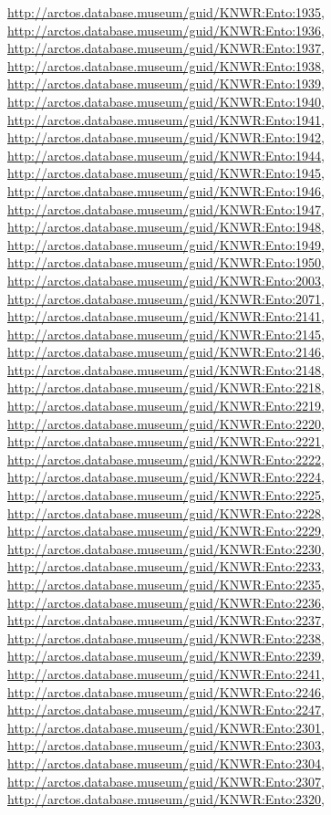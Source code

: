 \documentclass[9pt, article]{memoir}
\begin{document}
\begin{multicols}{2}
\url{http://arctos.database.museum/guid/KNWR:Ento:1935}, 
\url{http://arctos.database.museum/guid/KNWR:Ento:1936}, 
\url{http://arctos.database.museum/guid/KNWR:Ento:1937}, 
\url{http://arctos.database.museum/guid/KNWR:Ento:1938}, 
\url{http://arctos.database.museum/guid/KNWR:Ento:1939}, 
\url{http://arctos.database.museum/guid/KNWR:Ento:1940}, 
\url{http://arctos.database.museum/guid/KNWR:Ento:1941}, 
\url{http://arctos.database.museum/guid/KNWR:Ento:1942}, 
\url{http://arctos.database.museum/guid/KNWR:Ento:1944}, 
\url{http://arctos.database.museum/guid/KNWR:Ento:1945}, 
\url{http://arctos.database.museum/guid/KNWR:Ento:1946}, 
\url{http://arctos.database.museum/guid/KNWR:Ento:1947}, 
\url{http://arctos.database.museum/guid/KNWR:Ento:1948}, 
\url{http://arctos.database.museum/guid/KNWR:Ento:1949}, 
\url{http://arctos.database.museum/guid/KNWR:Ento:1950}, 
\url{http://arctos.database.museum/guid/KNWR:Ento:2003}, 
\url{http://arctos.database.museum/guid/KNWR:Ento:2071}, 
\url{http://arctos.database.museum/guid/KNWR:Ento:2141}, 
\url{http://arctos.database.museum/guid/KNWR:Ento:2145}, 
\url{http://arctos.database.museum/guid/KNWR:Ento:2146}, 
\url{http://arctos.database.museum/guid/KNWR:Ento:2148}, 
\url{http://arctos.database.museum/guid/KNWR:Ento:2218}, 
\url{http://arctos.database.museum/guid/KNWR:Ento:2219}, 
\url{http://arctos.database.museum/guid/KNWR:Ento:2220}, 
\url{http://arctos.database.museum/guid/KNWR:Ento:2221}, 
\url{http://arctos.database.museum/guid/KNWR:Ento:2222}, 
\url{http://arctos.database.museum/guid/KNWR:Ento:2224}, 
\url{http://arctos.database.museum/guid/KNWR:Ento:2225}, 
\url{http://arctos.database.museum/guid/KNWR:Ento:2228}, 
\url{http://arctos.database.museum/guid/KNWR:Ento:2229}, 
\url{http://arctos.database.museum/guid/KNWR:Ento:2230}, 
\url{http://arctos.database.museum/guid/KNWR:Ento:2233}, 
\url{http://arctos.database.museum/guid/KNWR:Ento:2235}, 
\url{http://arctos.database.museum/guid/KNWR:Ento:2236}, 
\url{http://arctos.database.museum/guid/KNWR:Ento:2237}, 
\url{http://arctos.database.museum/guid/KNWR:Ento:2238}, 
\url{http://arctos.database.museum/guid/KNWR:Ento:2239}, 
\url{http://arctos.database.museum/guid/KNWR:Ento:2241}, 
\url{http://arctos.database.museum/guid/KNWR:Ento:2246}, 
\url{http://arctos.database.museum/guid/KNWR:Ento:2247}, 
\url{http://arctos.database.museum/guid/KNWR:Ento:2301}, 
\url{http://arctos.database.museum/guid/KNWR:Ento:2303}, 
\url{http://arctos.database.museum/guid/KNWR:Ento:2304}, 
\url{http://arctos.database.museum/guid/KNWR:Ento:2307}, 
\url{http://arctos.database.museum/guid/KNWR:Ento:2320}, 

\end{multicols}
\end{document}

